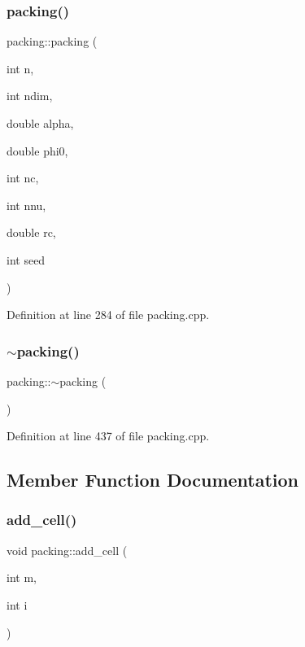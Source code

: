 \subsubsection{\texorpdfstring{packing()}{packing()}\hspace{0.1cm}{\footnotesize\ttfamily [4/4]}}
{\footnotesize\ttfamily packing\+::packing (\begin{DoxyParamCaption}\item[{int}]{n,  }\item[{int}]{ndim,  }\item[{double}]{alpha,  }\item[{double}]{phi0,  }\item[{int}]{nc,  }\item[{int}]{nnu,  }\item[{double}]{rc,  }\item[{int}]{seed }\end{DoxyParamCaption})}



Definition at line 284 of file packing.\+cpp.

\mbox{\label{classpacking_a985cd1712c1e0c7e9f3927e847383810}} 
\subsubsection{\texorpdfstring{$\sim$packing()}{~packing()}}
{\footnotesize\ttfamily packing\+::$\sim$packing (\begin{DoxyParamCaption}{ }\end{DoxyParamCaption})}



Definition at line 437 of file packing.\+cpp.



\subsection{Member Function Documentation}
\mbox{\label{classpacking_a433ee4f918ce8124cc4dc24a29dcbe1c}} 
\subsubsection{\texorpdfstring{add\+\_\+cell()}{add\_cell()}}
{\footnotesize\ttfamily void packing\+::add\+\_\+cell (\begin{DoxyParamCaption}\item[{int}]{m,  }\item[{int}]{i }\end{DoxyParamCaption})}



